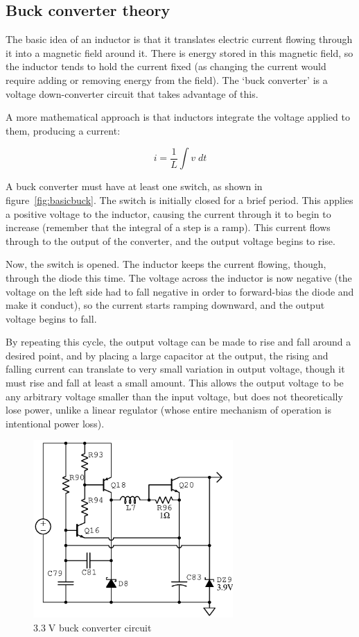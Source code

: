 \documentclass[article,oneside]{memoir}
\newcommand{\mr}[1]{\ensuremath{\mathrm{#1}}}
\begin{document}
\begin{multicols}{2}
\subsection{Buck converter theory}

The basic idea of an inductor is that it translates electric current flowing
through it into a magnetic field around it. There is energy stored in this
magnetic field, so the inductor tends to hold the current fixed (as changing
the current would require adding or removing energy from the field). The
`buck converter' is a voltage down-converter circuit that takes advantage
of this.

A more mathematical approach is that inductors integrate the voltage applied
to them, producing a current:

\begin{equation*}
    i = \frac{1}{L} \int v\;dt
\end{equation*}

A buck converter must have at least one switch, as shown in
figure~\ref{fig:basicbuck}.  The switch is initially closed for a brief period.
This applies a positive voltage to the inductor, causing the current through it
to begin to increase (remember that the integral of a step is a ramp). This
current flows through to the output of the converter, and the output voltage
begins to rise.

Now, the switch is opened. The inductor keeps the current flowing, though,
through the diode this time. The voltage across the inductor is now negative
(the voltage on the left side had to fall negative in order to forward-bias the
diode and make it conduct), so the current starts ramping downward, and the
output voltage begins to fall.~\cite[pp.~356--357]{aoe-vreg}

By repeating this cycle, the output voltage can be made to rise and fall around
a desired point, and by placing a large capacitor at the output, the rising and
falling current can translate to very small variation in output voltage, though
it must rise and fall at least a small amount. This allows the output voltage
to be any arbitrary voltage smaller than the input voltage, but does not
theoretically lose power, unlike a linear regulator (whose entire mechanism of
operation is intentional power loss).


\begin{figure}[H]
\centering
\includegraphics[width=3in]{3v3buck}
\caption{$3.3\;\mr{V}$ buck converter circuit}
\label{fig:3v3buck}
\end{figure}


\end{multicols}
\end{document}
